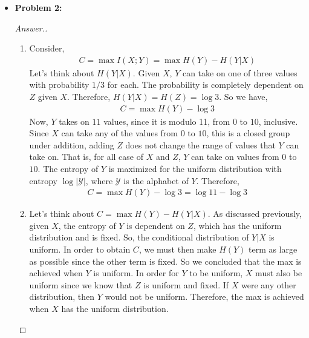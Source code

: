 \documentclass[10pt,twoside]{article}
\begin{document}
\begin{itemize}
    \item\textbf{Problem 2:} \newline
    \noindent\makebox[\linewidth]{\rule{18cm}{0.4pt}}
    \begin{proof}[Answer.]
    \begin{enumerate}
        \item Consider,
        \begin{gather*}
            C = \max I(X;Y) = \max H(Y ) - H(Y|X)
        \end{gather*}
        Let's think about $H(Y|X)$. Given $X$, $Y$ can take on one of three values with probability $1/3$ for each. The probability is completely dependent on $Z$ given $X$. Therefore, $H(Y|X) = H(Z) = \log 3$. So we have,
        \begin{gather*}
            C = \max H(Y) - \log 3
        \end{gather*}
        Now, $Y$ takes on $11$ values, since it is modulo 11, from $0$ to $10$, inclusive. Since $X$ can take any of the values from $0$ to $10$, this is a closed group under addition, adding $Z$ does not change the range of values that $Y$ can take on. That is, for all case of $X$ and $Z$, $Y$ can take on values from $0$ to $10$. The entropy of $Y$ is maximized for the uniform distribution with entropy $\log |\mathcal{Y}|$, where $\mathcal{Y}$ is the alphabet of $Y$. Therefore,
        \begin{gather*}
            C = \max H(Y) - \log 3 = \log 11 - \log 3
        \end{gather*}
        \item Let's think about $C = \max H(Y) - H(Y|X)$. As discussed previously, given $X$, the entropy of $Y$ is dependent on $Z$, which has the uniform distribution and is fixed. So, the conditional distribution of $Y|X$ is uniform. In order to obtain $C$, we must then make $H(Y)$ term as large as possible since the other term is fixed. So we concluded that the max is achieved when $Y$ is uniform. In order for $Y$ to be uniform, $X$ must also be uniform since we know that $Z$ is uniform and fixed. If $X$ were any other distribution, then $Y$ would not be uniform. Therefore, the max is achieved when $X$ has the uniform distribution.
    \end{enumerate}
    \end{proof}

    \newpage
    

\end{itemize}
\end{document}

